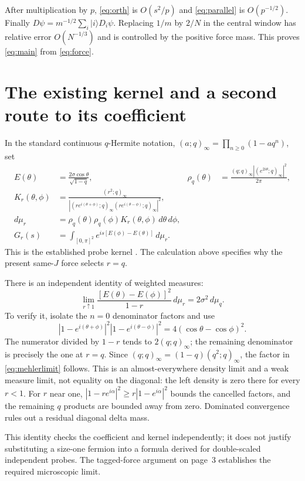 \documentclass[11pt,a4paper]{article}
\begin{document}
After multiplication by $p$, \eqref{eq:orth} is $O(s^2/p)$ and
\eqref{eq:parallel} is $O(p^{-1/2})$. Finally
$D\psi=m^{-1/2}\sum_i|i\rangle D_i\psi$.
Replacing $1/m$ by $2/N$ in the central window has relative error
$O(N^{-1/3})$ and is controlled by the positive force mass.
This proves \eqref{eq:main} from \eqref{eq:force}.

\newpage
\section{The existing kernel and a second route to its coefficient}
In the standard continuous $q$-Hermite notation,
$(a;q)_\infty=\prod_{n\geq0}(1-aq^n)$, set
\begin{align}
 E(\theta)&=\frac{2\sigma\cos\theta}{\sqrt{1-q}},&
 \rho_q(\theta)&=\frac{(q;q)_\infty|(e^{2i\theta};q)_\infty|^2}{2\pi},\\
 K_r(\theta,\phi)&=\frac{(r^2;q)_\infty}
 {|(re^{i(\theta+\phi)};q)_\infty
   (re^{i(\theta-\phi)};q)_\infty|^2},\\
 d\mu_r&=\rho_q(\theta)\rho_q(\phi)K_r(\theta,\phi)\,d\theta\,d\phi,\\
 G_r(s)&=\int_{[0,\pi]^2}e^{is[E(\phi)-E(\theta)]}\,d\mu_r.
\end{align}
This is the established probe kernel \cite{BNR}. The calculation
above specifies why the present same-$J$ force selects $r=q$.

There is an independent identity of weighted measures:
\begin{equation}\label{eq:mehlerlimit}
 \lim_{r\uparrow1}\frac{[E(\theta)-E(\phi)]^2}{1-r}\,d\mu_r
 =2\sigma^2\,d\mu_q.
\end{equation}
To verify it, isolate the $n=0$ denominator factors and use
\begin{equation}
 |1-e^{i(\theta+\phi)}|^2|1-e^{i(\theta-\phi)}|^2
 =4(\cos\theta-\cos\phi)^2.
\end{equation}
The numerator divided by $1-r$ tends to $2(q;q)_\infty$;
the remaining denominator is precisely the one at $r=q$.
Since $(q;q)_\infty=(1-q)(q^2;q)_\infty$, the factor in
\eqref{eq:mehlerlimit} follows. This is an almost-everywhere density
limit and a weak measure limit, not equality on the diagonal:
the left density is zero there for every $r<1$.
For $r$ near one, $|1-re^{i\alpha}|^2\geq
r|1-e^{i\alpha}|^2$ bounds the cancelled factors, and the remaining
$q$ products are bounded away from zero. Dominated convergence
rules out a residual diagonal delta mass.

This identity checks the coefficient and kernel independently; it
does not justify substituting a size-one fermion into a formula
derived for double-scaled independent probes. The tagged-force
argument on page~3 establishes the required microscopic limit.
\end{document}
